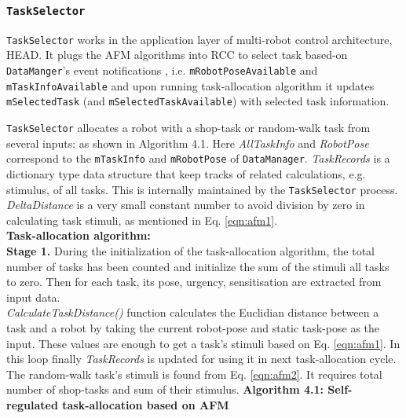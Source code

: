 \subsubsection*{\texttt{TaskSelector}}
\texttt{TaskSelector} works in the application layer of multi-robot control architecture, HEAD. It plugs the AFM algorithms into RCC to select task based-on\\ \texttt{DataManger}'s event notifications , i.e. \texttt{mRobotPoseAvailable} and\\ \texttt{mTaskInfoAvailable} and upon running task-allocation algorithm it updates  \texttt{mSelectedTask} (and \texttt{mSelectedTaskAvailable}) with selected task information.

\texttt{TaskSelector}  allocates a robot with a shop-task or random-walk task from several inputs: as shown in Algorithm 4.1. Here  \textit{AllTaskInfo} and \textit{RobotPose} correspond to the \texttt{mTaskInfo} and \texttt{mRobotPose} of \texttt{DataManager}. \textit{TaskRecords} is a dictionary type data structure that keep tracks of related calculations, e.g. stimulus, of all tasks. This is internally maintained by the \texttt{TaskSelector} process.  \textit{DeltaDistance} is a very small constant number to avoid division by zero in calculating task stimuli, as mentioned in Eq. \ref{eqn:afm1}.\\
\textbf{Task-allocation algorithm:}\\
\textbf{Stage 1.} During the initialization of the task-allocation algorithm, the total number of tasks has been counted and initialize the sum of the stimuli all tasks to zero. Then for each task, its pose, urgency, sensitisation are extracted from input data.\\  \textit{CalculateTaskDistance()} function calculates the Euclidian distance between a task and a robot by taking the current robot-pose and static task-pose as the input. These values are enough to get a task's stimuli based on Eq. \ref{eqn:afm1}. In this loop finally  \textit{TaskRecords} is updated for using it in next task-allocation cycle. The random-walk task's stimuli is found from Eq. \ref{eqn:afm2}. It requires total number of shop-tasks and sum of their stimulus.
\newline
\textbf{Algorithm 4.1: Self-regulated task-allocation based on AFM}
\vspace{-3mm}
\newline
\HRule
